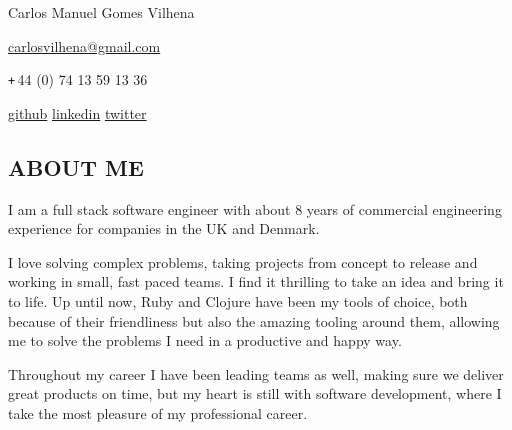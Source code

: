 \documentclass{res}
\def\Plus{\texttt{+}\,}
\begin{document}
\thispagestyle{empty}
\centerline{Carlos Manuel Gomes Vilhena}
\vspace{0.1in}
\centerline{
  \href{mailto:carlosvilhena@gmail.com}{carlosvilhena@gmail.com}
}
\centerline{\Plus 44 (0) 74 13 59 13 36}
\centerline{
  \href{http://github.com/carvil}{github} \hspace{0.5 cm}
  \href{http://www.linkedin.com/in/carlosvilhena}{linkedin}  \hspace{0.5 cm}
  \href{http://www.twitter.com/carvil_}{twitter}
}

\begin{resume}

\section{ABOUT ME}
I am a full stack software engineer with about 8 years of commercial engineering
experience for companies in the UK and Denmark.

I love solving complex problems, taking projects from concept to release and
working in small, fast paced teams. I find it thrilling to take an idea and
bring it to life. Up until now, Ruby and Clojure have been my tools of
choice, both because of their friendliness but also the amazing tooling
around them, allowing me to solve the problems I need in a productive and happy
way.

Throughout my career I have been leading teams as well, making sure we deliver
great products on time, but my heart is still with software development, where
I take the most pleasure of my professional career.

\vspace{0.1in}

\end{resume}
\end{document}
